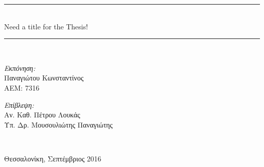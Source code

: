 \begin{titlepage}
\begin{center}
    \rule{450pt}{4pt} \\[0.4cm]
    {\fontsize{20.26pt}{1em}\selectfont Need a title for the Thesis!}

    \rule{350pt}{4pt} \\[4cm]

    \begin{minipage}{0.4\textwidth}
      \begin{flushleft} \large
        \emph{Εκπόνηση:} \\
        Παναγιώτου Κωνσταντίνος \\
        ΑΕΜ: 7316
      \end{flushleft}
    \end{minipage}
    \begin{minipage}{0.4\textwidth}
      \begin{flushright} \large
        \emph{Επίβλεψη:} \\
        Αν. Καθ. Πέτρου Λουκάς\\
        Υπ. Δρ. Μουσουλιώτης Παναγιώτης \\
      \end{flushright}
    \end{minipage}
    \\[1cm]
    \vfill

    \large Θεσσαλονίκη, Σεπτέμβριος 2016

  \end{center}
\end{titlepage}

